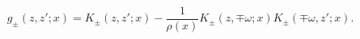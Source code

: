 \begin{equation}\label{gdef}
g_\pm(z,z';x)=K_\pm(z,z';x)-\frac{1}{\rho(x)}
K_\pm(z,\mp\omega;x)K_\pm(\mp\omega,z';x).
\end{equation}

